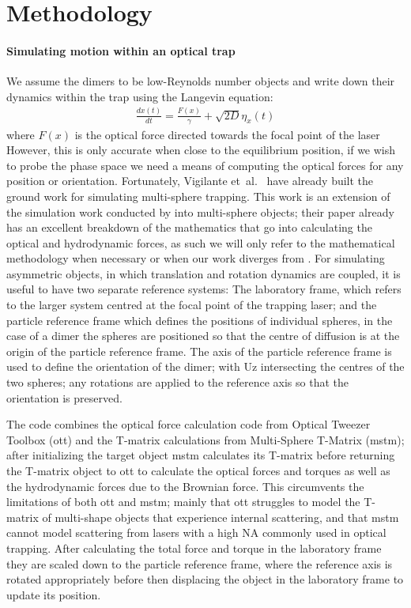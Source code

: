 \documentclass[preprint,  3p]{elsarticle}
\begin{document}
\section{Methodology}

\paragraph{Simulating motion within an optical trap}
We assume the dimers to be low-Reynolds number objects and write down
their dynamics within the trap using the Langevin equation:
\begin{align}
\label{eq:langevin}
\frac{dx(t)}{dt}=\frac{F(x)}{\gamma}+\sqrt{2D}\eta_x(t)
\end{align}
where $F(x)$ is the optical force directed towards the focal point of the laser However, this is only accurate when close to the equilibrium position, if we wish to probe the phase space we need a means of computing the optical forces for any position or orientation. Fortunately, Vigilante et~al.\ \cite{Vigilante_2020} have already built the ground work for simulating multi-sphere trapping. This work is an extension of the simulation work conducted by \cite{Vigilante_2020} into multi-sphere objects; their paper already has an excellent breakdown of the mathematics that go into calculating the optical and hydrodynamic forces, as such we will only refer to the mathematical methodology when necessary or when our work diverges from \cite{Vigilante_2020}. For simulating asymmetric objects, in which translation and rotation dynamics are coupled, it is useful to have two separate reference systems: The laboratory frame, which refers to the larger system centred at the focal point of the trapping laser; and the particle reference frame which defines the positions of individual spheres, in the case of a dimer the spheres are positioned so that the centre of diffusion is at the origin of the particle reference frame. The axis of the particle reference frame is used to define the orientation of the dimer; with Uz intersecting the centres of the two spheres; any rotations are applied to the reference axis so that the orientation is preserved.

The code combines the optical force calculation code from Optical Tweezer Toolbox (ott) and the T-matrix calculations from Multi-Sphere T-Matrix (mstm); after initializing the target object mstm calculates its T-matrix before returning the T-matrix object to ott to calculate the optical forces and torques as well as the hydrodynamic forces due to the Brownian force. This circumvents the limitations of both ott and mstm; mainly that ott struggles to model the T-matrix of multi-shape objects that experience internal scattering, and that mstm cannot model scattering from lasers with a high NA commonly used in optical trapping. After calculating the total force and torque in the laboratory frame they are scaled down to the particle reference frame, where the reference axis is rotated appropriately before then displacing the object in the laboratory frame to update its position.  
\end{document}
